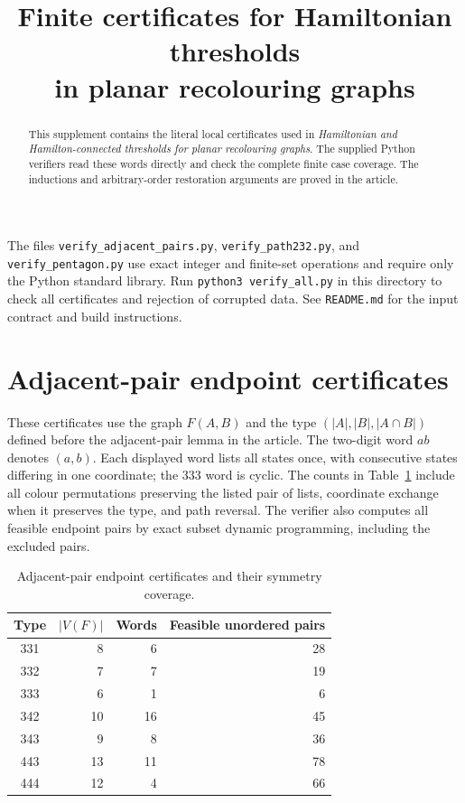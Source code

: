 \documentclass[11pt]{article}
\title{Finite certificates for Hamiltonian thresholds\\in planar recolouring graphs}
\author{}
\date{}
\numberwithin{equation}{section}
\numberwithin{table}{section}
\begin{document}
\maketitle
\begin{abstract}
This supplement contains the literal local certificates used in
\emph{Hamiltonian and Hamilton-connected thresholds for planar recolouring graphs}.
The supplied Python verifiers read these words directly and check the
complete finite case coverage. The inductions and arbitrary-order
restoration arguments are proved in the article.
\end{abstract}
The files \texttt{verify\_adjacent\_pairs.py},
\texttt{verify\_path232.py}, and \texttt{verify\_pentagon.py} use exact
integer and finite-set operations and require only the Python standard
library. Run \texttt{python3 verify\_all.py} in this directory to check
all certificates and rejection of corrupted data. See \texttt{README.md}
for the input contract and build instructions.
\appendix
\section{Adjacent-pair endpoint certificates}
\label{app:pair-five-certificates}
These certificates use the graph $F(A,B)$ and the type
$(|A|,|B|,|A\cap B|)$ defined before
the adjacent-pair lemma in the article. The two-digit word $ab$ denotes
$(a,b)$. Each displayed word lists all states once, with consecutive
states differing in one coordinate; the $333$ word is cyclic.
The counts in Table~\ref{tab:pair-five-counts} include all colour
permutations preserving the listed pair of lists, coordinate exchange
when it preserves the type, and path reversal. The verifier also computes all feasible endpoint pairs by exact subset
dynamic programming, including the excluded pairs.

\begin{table}[htbp]
\centering
\caption{Adjacent-pair endpoint certificates and their symmetry coverage.}
\label{tab:pair-five-counts}
\begin{tabular}{crrr}
\toprule
Type & $|V(F)|$ & Words & Feasible unordered pairs\\
\midrule
 331&8&6&28\\
 332&7&7&19\\
 333&6&1&6\\
 342&10&16&45\\
 343&9&8&36\\
 443&13&11&78\\
 444&12&4&66\\
\bottomrule
\end{tabular}
\end{table}
\end{document}
